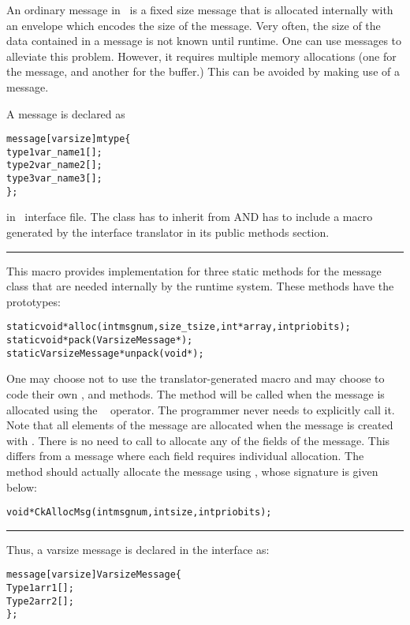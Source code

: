 An ordinary message in \charmpp\ is a fixed size message that is allocated
internally with an envelope which encodes the size of the message. Very often,
the size of the data contained in a message is not known until runtime. One can
use  messages to alleviate this problem.
However, it requires multiple memory allocations (one for the message, and
another for the buffer.) This can be avoided by making use of a 
message.

A  message is declared as 

\begin{alltt}
 message [varsize] mtype \{
   type1 var_name1[];
   type2 var_name2[];
   type3 var_name3[];
 \};
\end{alltt}

in \charmpp\ interface file. The class  has to inherit from
 AND has to include a macro generated by the interface
translator in its public methods section.

\tiny
\hrule
This macro provides implementation for three static methods for the message
class that are needed internally by the \charmpp{} runtime system. These
methods have the prototypes:
\begin{alltt}
    static void* alloc(int msgnum, size_t size, int* array, int priobits);
    static void* pack(VarsizeMessage*);
    static VarsizeMessage* unpack(void*);
\end{alltt}
One may choose not to use the translator-generated macro and may choose to code
their own ,  and  methods.
The  method will be called when the message is allocated using the
\CC\  operator. The programmer never needs to explicitly call it.  Note
that all elements of the message are allocated when the message is created with
.  There is no need to call  to allocate any of the fields of
the message.  This differs from a  message where each field requires
individual allocation.     The  method should actually allocate the
message using , whose signature is given below:
\begin{alltt}
void *CkAllocMsg(int msgnum, int size, int priobits); 
\end{alltt}  
\hrule
\normalsize

Thus, a varsize message is declared in the interface as: 

\begin{alltt}
 message [varsize] VarsizeMessage \{
   Type1 arr1[];
   Type2 arr2[];
 \};
\end{alltt}

